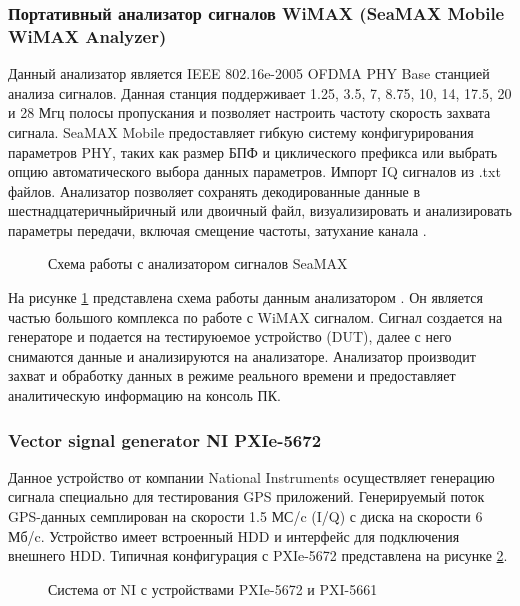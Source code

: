\subsubsection{Портативный анализатор сигналов WiMAX (SeaMAX Mobile WiMAX Analyzer)}
Данный анализатор является IEEE 802.16e-2005 OFDMA PHY Base станцией анализа сигналов. Данная станция 
поддерживает 1.25, 3.5, 7, 8.75, 10, 14, 17.5, 20 и 28 Мгц полосы пропускания и позволяет настроить
частоту скорость захвата сигнала. SeaMAX Mobile предоставляет гибкую систему конфигурирования параметров PHY, таких как
размер БПФ и циклического префикса или выбрать опцию автоматического выбора данных параметров. Импорт IQ сигналов
из .txt файлов. Анализатор позволяет сохранять декодированные данные в шестнадцатеричныйричный или двоичный файл,
визуализировать и анализировать параметры передачи, включая смещение частоты, затухание канала
\cite{seamax_overview, seamax_pdf}.

\begin{figure}[H]
\caption{Схема работы с анализатором сигналов SeaMAX}
\label{seamax}
\end{figure}

На рисунке \ref{seamax} представлена схема работы данным анализатором \cite{seamax_pdf}. Он является частью большого комплекса по работе
с WiMAX сигналом. Сигнал создается на генераторе и подается на тестируюемое устройство (DUT), далее с него снимаются 
данные и анализируются на анализаторе. Анализатор производит захват и обработку данных в режиме реального времени и
предоставляет аналитическую информацию на консоль ПК.

\subsubsection{Vector signal generator NI PXIe-5672}
Данное устройство от компании National Instruments осуществляет генерацию сигнала специально для тестирования
GPS приложений. Генерируемый поток GPS-данных семплирован на скорости 1.5 МС/c (I/Q) с диска на скорости 6 Мб/c.
Устройство имеет встроенный HDD и интерфейс для подключения внешнего HDD. Типичная конфигурация с PXIe-5672
представлена на рисунке \ref{pic:ni_system}.

\begin{figure}[H]
\begin{center}
\end{center}
\caption{Система от NI с устройствами PXIe-5672 и PXI-5661}
\label{pic:ni_system}
\end{figure}

